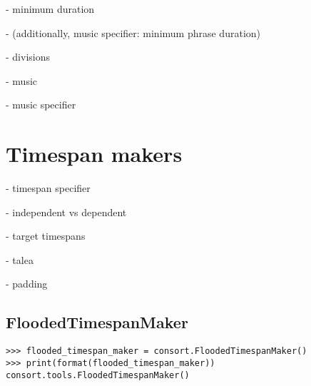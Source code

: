 - minimum duration

- (additionally, music specifier: minimum phrase duration)

- divisions

- music

- music specifier

\section{Timespan makers}

- timespan specifier

- independent vs dependent

- target timespans

- talea

- padding

\subsection{FloodedTimespanMaker} %

\begin{comment}
<abjad>
flooded_timespan_maker = consort.FloodedTimespanMaker()
print(format(flooded_timespan_maker))
</abjad>
\end{comment}

\begin{singlespacing}
\vspace{-0.5\baselineskip}
\begin{lstlisting}
>>> flooded_timespan_maker = consort.FloodedTimespanMaker()
>>> print(format(flooded_timespan_maker))
consort.tools.FloodedTimespanMaker()
\end{lstlisting}
\end{singlespacing}

\begin{comment}
<abjad>
music_specifiers = {'Violin Voice': 'violin music'}
target_timespan = timespantools.Timespan((1, 4), (11, 8))
timespan_inventory = flooded_timespan_maker(
    music_specifiers=music_specifiers,
    target_timespan=target_timespan,
    )
print(format(timespan_inventory))
</abjad>
\end{comment}

